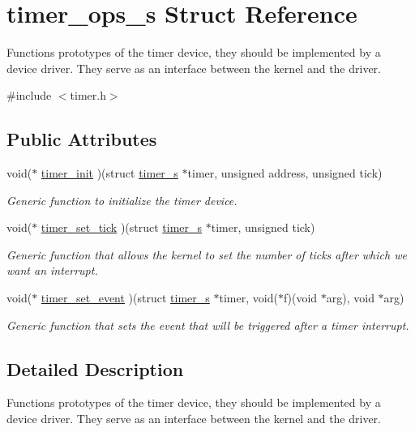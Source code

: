 \hypertarget{structtimer__ops__s}{\section{timer\-\_\-ops\-\_\-s Struct Reference}
\label{structtimer__ops__s}
}


Functions prototypes of the timer device, they should be implemented by a device driver. They serve as an interface between the kernel and the driver.  




{\ttfamily \#include $<$timer.\-h$>$}

\subsection*{Public Attributes}
\begin{DoxyCompactItemize}
\item 
void($\ast$ \hyperlink{structtimer__ops__s_a0eb1142effbe0998fda5c43a6650dc93}{timer\-\_\-init} )(struct \hyperlink{structtimer__s}{timer\-\_\-s} $\ast$timer, unsigned address, unsigned tick)
\begin{DoxyCompactList}\small\item\em Generic function to initialize the timer device. \end{DoxyCompactList}\item 
void($\ast$ \hyperlink{structtimer__ops__s_a4c7be27a967a8aa56bfb785e80afb254}{timer\-\_\-set\-\_\-tick} )(struct \hyperlink{structtimer__s}{timer\-\_\-s} $\ast$timer, unsigned tick)
\begin{DoxyCompactList}\small\item\em Generic function that allows the kernel to set the number of ticks after which we want an interrupt. \end{DoxyCompactList}\item 
void($\ast$ \hyperlink{structtimer__ops__s_a68a024355e7c40dc7cf97b0e9975cf73}{timer\-\_\-set\-\_\-event} )(struct \hyperlink{structtimer__s}{timer\-\_\-s} $\ast$timer, void($\ast$f)(void $\ast$arg), void $\ast$arg)
\begin{DoxyCompactList}\small\item\em Generic function that sets the event that will be triggered after a timer interrupt. \end{DoxyCompactList}\end{DoxyCompactItemize}


\subsection{Detailed Description}
Functions prototypes of the timer device, they should be implemented by a device driver. They serve as an interface between the kernel and the driver. 

